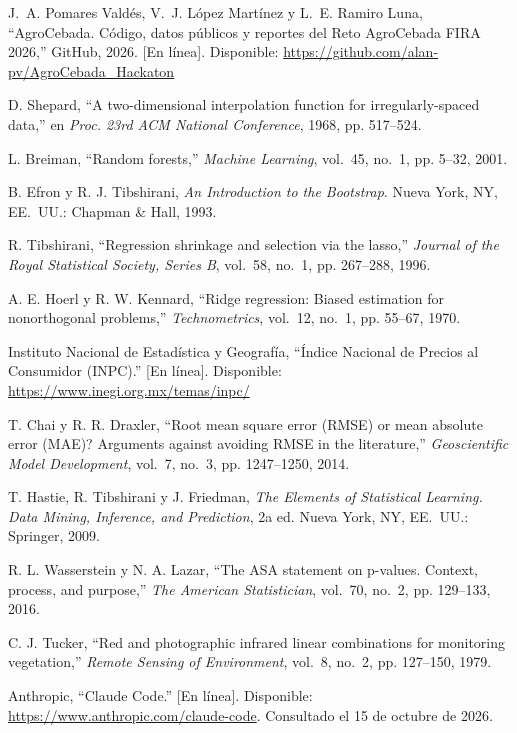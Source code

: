 J.~A. Pomares Valdés, V.~J. López Martínez y L.~E. Ramiro Luna, ``AgroCebada. Código, datos públicos y reportes del Reto AgroCebada FIRA 2026,'' GitHub, 2026.
[En línea]. Disponible: \url{https://github.com/alan-pv/AgroCebada_Hackaton}

D. Shepard, ``A two-dimensional interpolation function for irregularly-spaced data,'' en \emph{Proc. 23rd ACM National
Conference}, 1968, pp. 517--524.

L. Breiman, ``Random forests,'' \emph{Machine Learning}, vol.~45, no.~1, pp. 5--32, 2001.

B. Efron y R. J. Tibshirani, \emph{An Introduction to the Bootstrap}. Nueva York, NY, EE.~UU.: Chapman \& Hall, 1993.

R. Tibshirani, ``Regression shrinkage and selection via the lasso,'' \emph{Journal of the Royal Statistical Society,
Series B}, vol.~58, no.~1, pp. 267--288, 1996.

A. E. Hoerl y R. W. Kennard, ``Ridge regression: Biased estimation for nonorthogonal problems,'' \emph{Technometrics},
vol.~12, no.~1, pp. 55--67, 1970.

Instituto Nacional de Estadística y Geografía, ``Índice Nacional de Precios al Consumidor (INPC).'' [En línea].
Disponible: \url{https://www.inegi.org.mx/temas/inpc/}

T. Chai y R. R. Draxler, ``Root mean square error (RMSE) or mean absolute error (MAE)? Arguments against avoiding RMSE
in the literature,'' \emph{Geoscientific Model Development}, vol.~7, no.~3, pp. 1247--1250, 2014.

T. Hastie, R. Tibshirani y J. Friedman, \emph{The Elements of Statistical Learning. Data Mining, Inference, and
Prediction}, 2a ed. Nueva York, NY, EE.~UU.: Springer, 2009.

R. L. Wasserstein y N. A. Lazar, ``The ASA statement on p-values. Context, process, and purpose,'' \emph{The American
Statistician}, vol.~70, no.~2, pp. 129--133, 2016.

C. J. Tucker, ``Red and photographic infrared linear combinations for monitoring vegetation,'' \emph{Remote Sensing of
Environment}, vol.~8, no.~2, pp. 127--150, 1979.

Anthropic, ``Claude Code.'' [En línea]. Disponible: \url{https://www.anthropic.com/claude-code}. Consultado el 15 de
octubre de 2026.
